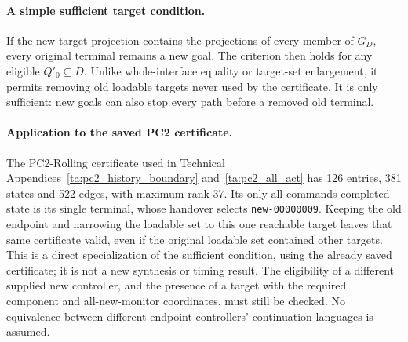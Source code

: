 \paragraph{A simple sufficient target condition.}
If the new target projection contains the projections of every member of $G_D$, every original terminal remains a new goal. The criterion then holds for any eligible $Q'_0\subseteq D$. Unlike whole-interface equality or target-set enlargement, it permits removing old loadable targets never used by the certificate. It is only sufficient: new goals can also stop every path before a removed old terminal.

\paragraph{Application to the saved PC2 certificate.}
The PC2-Rolling certificate used in Technical Appendices~\ref{ta:pc2_history_boundary} and~\ref{ta:pc2_all_act} has 126 entries, 381 states and 522 edges, with maximum rank 37. Its only all-commands-completed state is its single terminal, whose handover selects \texttt{new-00000009}. Keeping the old endpoint and narrowing the loadable set to this one reachable target leaves that same certificate valid, even if the original loadable set contained other targets. This is a direct specialization of the sufficient condition, using the already saved certificate; it is not a new synthesis or timing result. The eligibility of a different supplied new controller, and the presence of a target with the required component and all-new-monitor coordinates, must still be checked. No equivalence between different endpoint controllers' continuation languages is assumed.
